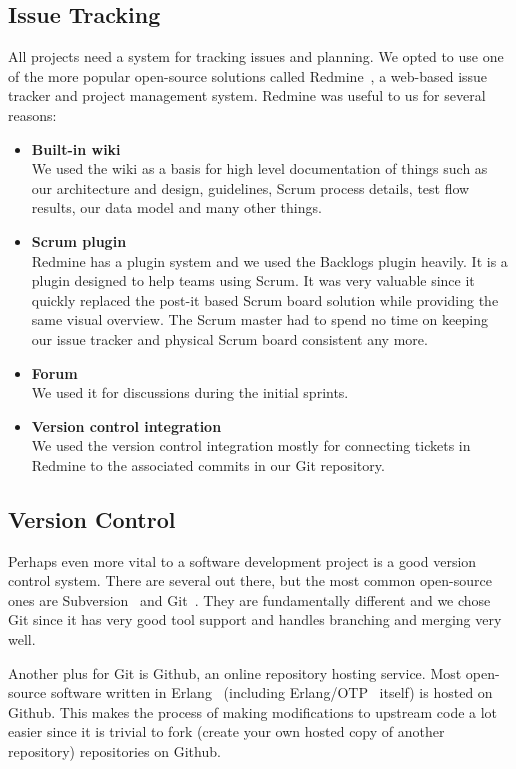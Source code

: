 \documentclass[11pt,a4paper]{report}
\begin{document}
\subsection{Issue Tracking}
All projects need a system for tracking issues and planning. We opted to use one
of the more popular open-source solutions called Redmine~\cite{redmine}, a
web-based issue tracker and project management system. Redmine was useful to us
for several reasons:
\begin{itemize}
\item \textbf{Built-in wiki} \\
  We used the wiki as a basis for high level documentation of things such as our
  architecture and design, guidelines, Scrum process details, test flow results,
  our data model and many other things.
\item \textbf{Scrum plugin} \\
  Redmine has a plugin system and we used the Backlogs plugin heavily. It is a
  plugin designed to help teams using Scrum. It was very valuable since it
  quickly replaced the post-it based Scrum board solution while providing the
  same visual overview. The Scrum master had to spend no time on keeping our
  issue tracker and physical Scrum board consistent any more.
\item \textbf{Forum} \\
  We used it for discussions during the initial sprints.
\item \textbf{Version control integration} \\
  We used the version control integration mostly for connecting tickets in
  Redmine to the associated commits in our Git repository.
\end{itemize}
\subsection{Version Control}
Perhaps even more vital to a software development project is a good version
control system. There are several out there, but the most common open-source
ones are Subversion~\cite{subversion} and Git~\cite{git_vcs}. They are fundamentally different and we chose Git
since it has very good tool support and handles branching and merging very well.

Another plus for Git is Github, an online repository hosting service. Most
open-source software written in Erlang~\cite{erlang_proglang} (including Erlang/OTP~\cite{erlang_otp} itself) is hosted
on Github. This makes the process of making modifications to upstream code a lot
easier since it is trivial to fork (create your own hosted copy of another
repository) repositories on Github.
\end{document}

